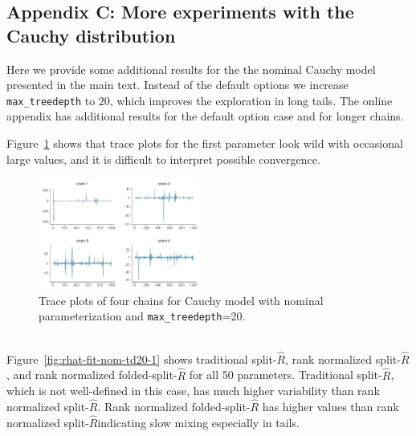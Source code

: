 \documentclass[american,]{article}
\newcommand{\sRhat}{split-$\widehat{R}$}
\theoremstyle{definition}
\begin{document}
\hypertarget{AppendixC}{%
\subsection*{Appendix C: More experiments with the Cauchy distribution}\label{AppendixE}}

Here we provide some additional results for the the nominal Cauchy
model presented in the main text. Instead of the default options we
increase \texttt{max\_treedepth} to \(20\), which improves the
exploration in long tails. The online appendix has additional results
for the default option case and for longer chains.


Figure~\ref{fig:trace-fit-nom-td20-1} shows that trace plots for the first
parameter look wild with occasional large values, and it is difficult
to interpret possible convergence.
\begin{figure}[tp]
  \centering
  \includegraphics[width=0.47\textwidth]{graphics/trace-fit-nom-td20-1.pdf}
  \caption{Trace plots of four chains for Cauchy model with nominal parameterization and \texttt{max\_treedepth}=20.\\~}
  \label{fig:trace-fit-nom-td20-1}
\end{figure}
%
Figure~\ref{fig:rhat-fit-nom-td20-1} shows traditional \sRhat,
rank normalized \sRhat, and rank normalized
folded-split-\(\widehat{R}\) for all 50 parameters. Traditional \sRhat, which is
not well-defined in this case, has much higher variability than rank
normalized \sRhat.  Rank normalized
folded-split-\(\widehat{R}\) has higher values than rank normalized
\sRhat indicating slow mixing especially in tails.
% 
\end{document}
